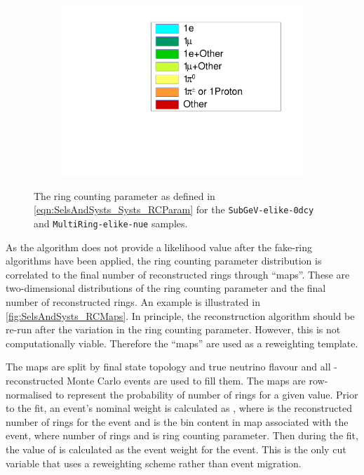 \begin{figure}[h]
\begin{subfigure}[t]{0.49\textwidth}
    \includegraphics[width=\textwidth, trim={0mm 0mm 0mm 0mm}, clip,page=1]{Figures/Selections/RCParameterLegend.pdf}
  \end{subfigure}
  \caption{The ring counting parameter as defined in \autoref{eqn:SelsAndSysts_Systs_RCParam} for the \texttt{SubGeV-elike-0dcy} and \texttt{MultiRing-elike-nue} samples.}
  \label{fig:SelsAndSysts_RCParameterDistribution}
\end{figure}

As the \fq algorithm does not provide a likelihood value after the fake-ring algorithms have been applied, the ring counting parameter distribution is correlated to the final number of reconstructed rings through ``maps''. These are two-dimensional distributions of the ring counting parameter and the final number of reconstructed rings. An example is illustrated in \autoref{fig:SelsAndSysts_RCMaps}. In principle, the \fq reconstruction algorithm should be re-run after the variation in the ring counting parameter. However, this is not computationally viable. Therefore the ``maps'' are used as a reweighting template.

The maps are split by final state topology and true neutrino flavour and all \fq-reconstructed Monte Carlo events are used to fill them. The maps are row-normalised to represent the probability of  number of rings for a given  value. Prior to the fit, an event's nominal weight is calculated as , where  is the reconstructed number of rings for the  event and  is the bin content in map associated with the  event, where  number of rings and  is ring counting parameter. Then during the fit, the value of  is calculated as the event weight for the  event. This is the only cut variable that uses a reweighting scheme rather than event migration.

